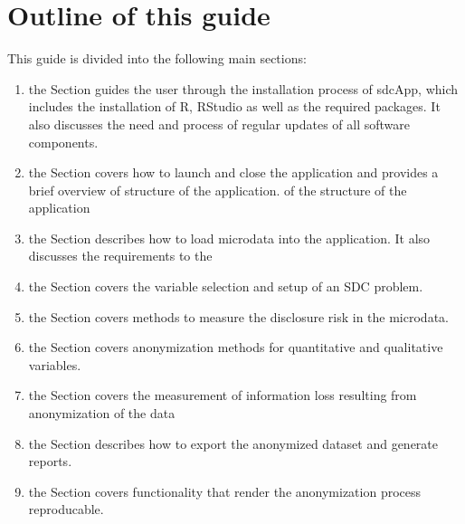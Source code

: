 \documentclass[letterpaper,10pt,english]{sphinxmanual}
\begin{document}
\section{Outline of this guide}
\label{\detokenize{introduction:outline-of-this-guide}}
This guide is divided into the following main sections:
\begin{enumerate}
\item {} 
the Section  guides the user through the installation process of sdcApp, which includes the installation of R, RStudio as well as the required packages. It also discusses the need and process of regular updates of all software components.

\item {} 
the Section  covers how to launch and close the application and provides a brief overview of structure of the application.  of the structure of the application

\item {} 
the Section  describes how to load microdata into the application. It also discusses the requirements to the

\item {} 
the Section   covers the variable selection and setup of an SDC problem.

\item {} 
the Section  covers methods to measure the disclosure risk in the microdata.

\item {} 
the Section  covers anonymization methods for quantitative and qualitative variables.

\item {} 
the Section  covers the measurement of information loss resulting from anonymization of the data

\item {} 
the Section  describes how to export the anonymized dataset and generate reports.

\item {} 
the Section  covers functionality that render the anonymization process reproducable.

\end{enumerate}
\end{document}
